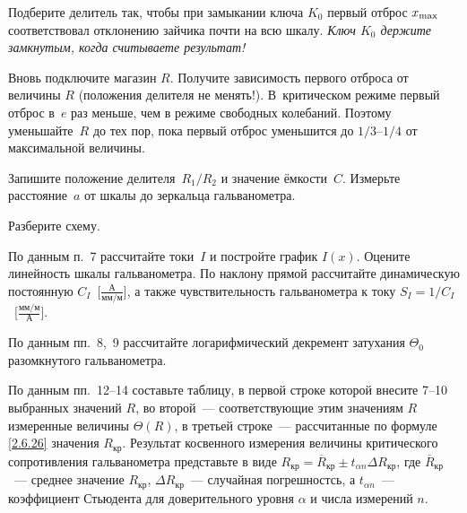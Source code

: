 \begin{lab:task}
Подберите делитель так, чтобы при замыкании ключа
$K_0$ первый отброс $x_{\rm max}$ соответствовал отклонению
зайчика почти на всю шкалу.
\emph{Ключ $K_0$ держите замкнутым, когда считываете результат!}

	\item Вновь подключите магазин $R$. 
    Получите зависимость первого отброса от величины $R$
    (положения делителя не менять!). 
    В~критическом режиме первый отброс в~$e$ раз меньше, 
    чем в режиме свободных колебаний. Поэтому уменьшайте~$R$ до тех пор, 
    пока первый отброс уменьшится до $1/3$--$1/4$ от максимальной величины.

	\item Запишите положение делителя~$R_1/R_2$ и значение ёмкости~$C$. 
    Измерьте расстояние~$a$ от шкалы до зеркальца гальванометра.

	\item Разберите схему.


	\item По данным п.~7 рассчитайте токи~$I$ и постройте график $I(x)$. 
    Оцените линейность шкалы гальванометра. По наклону прямой рассчитайте 
    динамическую постоянную $C_I$~[$\frac{А}{мм/м}$], 
    а также чувствительность гальванометра к току $S_I=1/C_I$~[$\frac{мм/м}{А}$].

	\item По данным пп.~8,~9 рассчитайте логарифмический декремент затухания $\Theta_0$
разомкнутого гальванометра.

	\item По данным пп.~12--14 составьте таблицу, в первой строке которой
внесите 7--10 выбранных значений $R$, во второй~--- соответствующие
этим значениям $R$ измеренные величины $\Theta(R)$, в третьей строке~--- 
рассчитанные по формуле \eqref{2.6.26} значения $R_{\text{кр}}$. Результат косвенного 
измерения величины критического сопротивления гальванометра представьте в 
виде $R_{\text{кр}}=\overline R_{\text{кр}}\pm t_{\alpha n}\Delta R_{\text{кр}}$,
где $\overline R_{\text{кр}}$~--- среднее значение $R_{\text{кр}}$, 
$\Delta R_{\text{кр}}$~--- случайная погрешностсь, а $t_{\alpha n}$~--- коэффициент
Стьюдента для доверительного уровня $\alpha$ и числа измерений $n$.



\end{lab:task}
